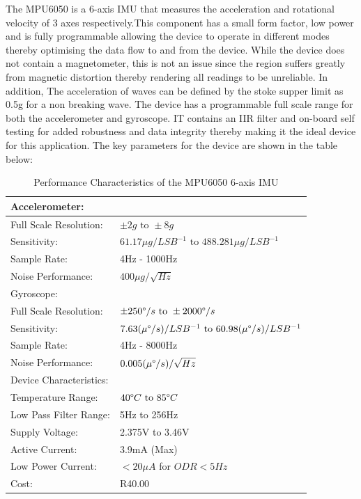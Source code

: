 The MPU6050 is a 6-axis IMU that measures the acceleration and rotational velocity of 3 axes respectively.This component has a small form factor, low power and is fully programmable allowing the device to operate in different modes thereby optimising the data flow to and from the device. While the device does not contain a magnetometer, this is not an issue since the region suffers greatly from magnetic distortion \cite{kohout2015device} thereby rendering all readings to be unreliable. In addition, The acceleration of waves can be defined by the stoke supper limit \cite{kohout2015device} as 0.5g for a non breaking wave. The device has a programmable full scale range for both the accelerometer and gyroscope. IT contains an IIR filter and on-board self testing for added robustness and data integrity thereby making it  the ideal device for this application. The key parameters for the device are shown in the table below:
\begin{table}[H]
	\centering
	\caption{Performance Characteristics of the MPU6050 6-axis IMU }
	\begin{tabular}{|l|l|}
		\multicolumn{2}{l}{Accelerometer:}\\
		\hline
		Full Scale Resolution:  & $ \pm 2g \text{ to } \pm8g$\\
		\hline
		Sensitivity: &  $61.17 \mu g/LSB^{-1} \text{ to } 488.281\mu g/LSB^{-1}$\\
		\hline
		Sample Rate: & 4Hz - 1000Hz\\
		\hline
		Noise Performance: & $400\mu g/\sqrt{Hz}$\\
		\hline
		\multicolumn{2}{l}{Gyroscope:}\\
		\hline
		Full Scale Resolution:  & $\pm 250\degree/s \text{ to } \pm 2000\degree/s $ \\
		\hline
		Sensitivity: &  $7.63(\mu\degree/s)/LSB^{-1} \text{ to } 60.98(\mu\degree/s)/LSB^{-1}$\\
		\hline
		Sample Rate: & 4Hz - 8000Hz\\
		\hline
		Noise Performance: & $0.005(\mu\degree/s)/\sqrt{Hz}$\\
		\hline
		\multicolumn{2}{l}{Device Characteristics:}\\
		\hline
		Temperature Range: & $40\degree C \text{ to } 85 \degree C$\\
		\hline
		Low Pass Filter Range: & 5Hz to 256Hz \\
		\hline
		Supply Voltage: & 2.375V to 3.46V\\
		\hline 
		Active Current: & 3.9mA (Max) \\
		\hline
		Low Power Current: & $< 20 \mu A$ for $ODR < 5Hz$\\
		\hline
		Cost: & R40.00 \footnotemark\\
		\hline
	\end{tabular}
	\label{tab:mpu_specs}
\end{table}

